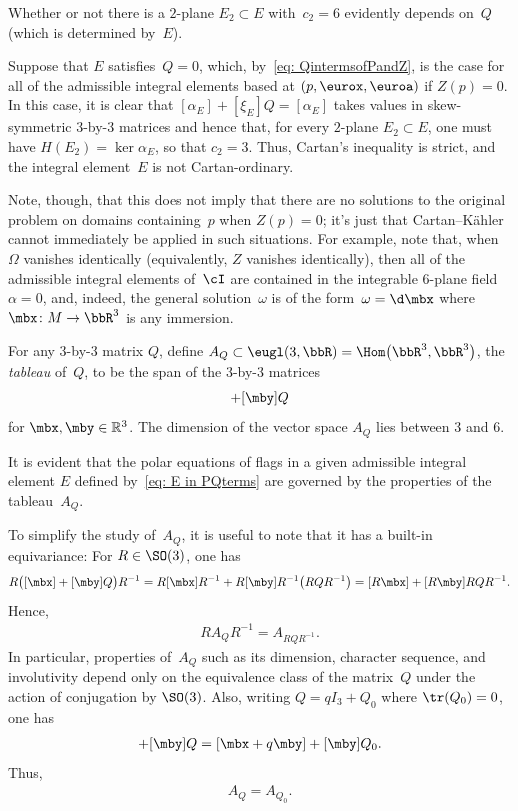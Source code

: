Whether or not there is a $2$-plane $E_2\subset E$ with~$c_2 = 6$
evidently depends on~$Q$ (which is determined by~$E$).

\begin{Example}\label{ex: noninvolutivity}
Suppose that $E$ satisfies~$Q = 0$, which, by~\eqref{eq: QintermsofPandZ},
is the case for all of the admissible integral elements based at $(p,\eurox,\euroa)$
if $Z(p) = 0$.
In this case, it is clear that $\left[\alpha_E\right]+\left[\xi_E\right]Q
= \left[\alpha_E\right]$ takes values in skew-symmetric $3$-by-$3$
matrices and hence that, for every $2$-plane $E_2\subset E$,
one must have $H(E_2) = \ker\alpha_E$, so that $c_2=3$.
Thus, Cartan's inequality is strict,
and the integral element~$E$ is not Cartan-ordinary.

Note, though, that this does not imply that there are no solutions
to the original problem on domains containing~$p$ when $Z(p)=0$;
it's just that Cartan--K\"ahler cannot immediately be applied
in such situations. For example, note that,
when~$\Omega$ vanishes identically (equivalently, $Z$ vanishes identically),
then all of the admissible integral elements of~$\cI$
are contained in the integrable $6$-plane field $\alpha = 0$,
and, indeed, the general solution~$\omega$ is of the form~$\omega=\d \mbx$
where $\mbx\colon M\to\bbR^3$ is any immersion.
\end{Example}

For any $3$-by-$3$ matrix $Q$, define $A_Q\subset \eugl(3,\bbR)
= \Hom \big(\bbR^3,\bbR^3\big)$, the \emph{tableau} of~$Q$,
to be the span of the $3$-by-$3$ matrices
\begin{gather*}
[\mbx ]+ [\mby] Q
\end{gather*}
for $\mbx,\mby\in\mathbb{R}^3$.
The dimension of the vector space $A_Q$ lies between $3$ and $6$.

It is evident that the polar equations of flags
in a given admissible integral element $E$
defined by~\eqref{eq: E in PQterms} are governed
by the properties of the tableau~$A_Q$.

To simplify the study of~$A_Q$, it is useful to note that
it has a built-in equivariance:
For $R\in\SO(3)$, one has
\begin{gather*}
R\bigl([\mbx ]+ [\mby] Q\bigr)R^{-1} = R[\mbx]R^{-1}+R[\mby]R^{-1}\big(RQR^{-1}\big) = [R\mbx] + [R\mby] RQR^{-1}.
\end{gather*}
Hence,
\begin{gather*}
R A_Q R^{-1} = A_{RQR^{-1}}.
\end{gather*}
In particular, properties of~$A_Q$ such as its dimension, character sequence, and involutivity depend only on the equivalence class of the matrix~$Q$ under the action of conjugation by $\SO(3)$. Also, writing $Q = q I_3 + Q_0$ where $\tr(Q_0) = 0$, one has
\begin{gather*}
[ \mbx ]+ [\mby ] Q = [ \mbx + q \mby ]+ [\mby ] Q_0 .
\end{gather*}
Thus,
\begin{gather*}
A_Q = A_{Q_0}.
\end{gather*}

